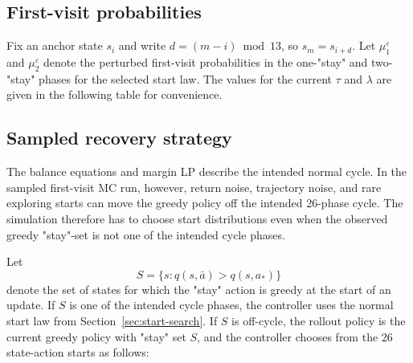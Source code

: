 \subsection{First-visit probabilities}

Fix an anchor state $s_i$ and write $d=(m-i)\bmod 13$, so $s_m=s_{i+d}$.  Let $\mu_1^\varepsilon$ and $\mu_2^\varepsilon$ denote the perturbed first-visit probabilities in the one-"stay" and two-"stay" phases for the selected start law. The values for the current $\tau$ and $\lambda$ are given in the following table for convenience. 
\begin{table}[H]
\centering
\small
\caption{Single-phase first-visit probabilities by relative distance $d$ for the tuned $n=13$ start law.}
\vspace{0.3cm}
\label{tab:first-visit-probabilities}
\end{table}







\subsection{Sampled recovery strategy}
\label{sec:recovery-strategy}

The balance equations and margin LP describe the intended normal
cycle. In the sampled first-visit MC run, however, return noise,
trajectory noise, and rare exploring starts can move the greedy policy off the intended 26-phase cycle. The simulation therefore has to choose start distributions even when the observed greedy "stay"-set is not one of the intended cycle phases.

Let
\begin{equation*}
    S=\{s:q(s,\bar a)>q(s,a_*)\}
\end{equation*}
denote the set of states for which the "stay" action is greedy at the start of an update. If $S$ is one of the intended cycle phases, the controller uses the normal start law from Section~\ref{sec:start-search}.
If $S$ is off-cycle, the rollout policy is the current greedy policy with "stay" set $S$, and the controller chooses from the $26$ state-action starts as follows:


